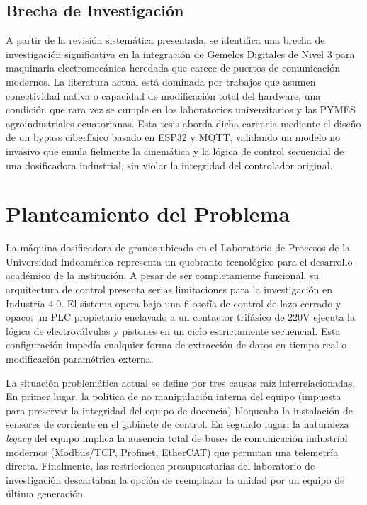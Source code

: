 \subsection{Brecha de Investigación}
A partir de la revisión sistemática presentada, se identifica una brecha de investigación significativa en la integración de Gemelos Digitales de Nivel 3 para maquinaria electromecánica heredada que carece de puertos de comunicación modernos. La literatura actual está dominada por trabajos que asumen conectividad nativa o capacidad de modificación total del hardware, una condición que rara vez se cumple en los laboratorios universitarios y las PYMES agroindustriales ecuatorianas. Esta tesis aborda dicha carencia mediante el diseño de un bypass ciberfísico basado en ESP32 y MQTT, validando un modelo no invasivo que emula fielmente la cinemática y la lógica de control secuencial de una dosificadora industrial, sin violar la integridad del controlador original.

\section{Planteamiento del Problema}

La máquina dosificadora de granos ubicada en el Laboratorio de Procesos de la Universidad Indoamérica representa un quebranto tecnológico para el desarrollo académico de la institución. A pesar de ser completamente funcional, su arquitectura de control presenta serias limitaciones para la investigación en Industria 4.0. El sistema opera bajo una filosofía de control de lazo cerrado y opaco: un PLC propietario enclavado a un contactor trifásico de 220V ejecuta la lógica de electroválvulas y pistones en un ciclo estrictamente secuencial. Esta configuración impedía cualquier forma de extracción de datos en tiempo real o modificación paramétrica externa.

La situación problemática actual se define por tres causas raíz interrelacionadas. En primer lugar, la política de no manipulación interna del equipo (impuesta para preservar la integridad del equipo de docencia) bloqueaba la instalación de sensores de corriente en el gabinete de control. En segundo lugar, la naturaleza \textit{legacy} del equipo implica la ausencia total de buses de comunicación industrial modernos (Modbus/TCP, Profinet, EtherCAT) que permitan una telemetría directa. Finalmente, las restricciones presupuestarias del laboratorio de investigación descartaban la opción de reemplazar la unidad por un equipo de última generación.

